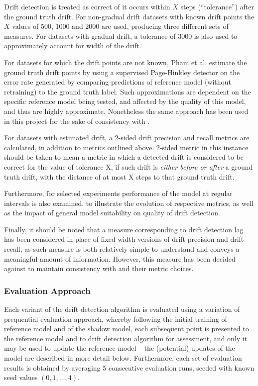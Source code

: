 \documentclass{svproc}
\begin{document}
Drift detection is treated as correct of it occurs within $X$ steps (“tolerance”) after the ground truth drift. For non-gradual drift datasets with known drift points the $X$ values of 500, 1000 and 2000 are used, producing three different sets of measures. For datasets with gradual drift, a tolerance of 3000 is also used to approximately account for width of the drift. 

For datasets for which the drift points are not known, Pham et al. \cite{pham2025} estimate the ground truth drift points by using a supervised Page-Hinkley detector on the error rate generated by comparing predictions of reference model (without retraining) to the ground truth label. Such approximations are dependent on the specific reference model being tested, and affected by the quality of this model, and thus are highly approximate. Nonetheless the same approach has been used in this project for the sake of consistency with \cite{pham2025}.

For datasets with estimated drift, a 2-sided drift precision and recall metrics are calculated, in addition to metrics outlined above. 2-sided metric in this instance should be taken to mean a metric in which a detected drift is considered to be correct for the value of tolerance X, if such drift is \textit{either before or after} a ground truth drift, with the distance of at most X steps to that ground truth drift.

Furthermore, for selected experiments performance of the model at regular intervals is also examined, to illustrate the evolution of respective metrics, as well as the impact of general model suitability on quality of drift detection.

Finally, it should be noted that a measure corresponding to drift detection lag has been considered in place of fixed-width versions of drift precision and drift recall, as such measure is both relatively simple to understand and conveys a meaningful amount of information. However, this measure has been decided against to maintain consistency with \cite{pham2025} and their metric choices.

\subsubsection{Evaluation Approach} Each variant of the drift detection algorithm is evaluated using a variation of prequential evaluation approach, whereby following the initial training of reference model and of the shadow model, each subsequent point is presented to the reference model and to drift detection algorithm for assessment, and only it may be used to update the reference model – the (potential) updates of the model are described in more detail below. Furthermore, each set of evaluation results is obtained by averaging 5 consecutive evaluation runs, seeded with known seed values $(0, 1, …, 4)$.
\end{document}
